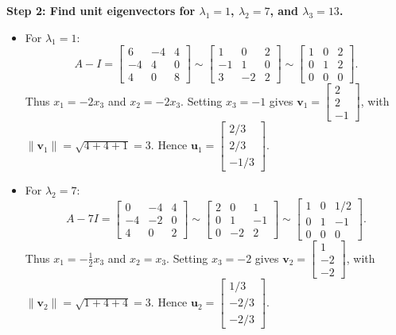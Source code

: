 \documentclass[11pt, letterpaper]{article}
\theoremstyle{definition}
\theoremstyle{remark}
\begin{document}
\textbf{Step 2: Find unit eigenvectors for $\lambda_1 = 1$, $\lambda_2 = 7$, and $\lambda_3 = 13$.}
\begin{itemize}
    \item For $\lambda_1 = 1$:
    \[
    A - I = \begin{bmatrix} 6 & -4 & 4 \\ -4 & 4 & 0 \\ 4 & 0 & 8 \end{bmatrix} \sim \begin{bmatrix} 1 & 0 & 2 \\ -1 & 1 & 0 \\ 3 & -2 & 2 \end{bmatrix} \sim \begin{bmatrix} 1 & 0 & 2 \\ 0 & 1 & 2 \\ 0 & 0 & 0 \end{bmatrix}.
    \]
    Thus $x_1 = -2x_3$ and $x_2 = -2x_3$. Setting $x_3 = -1$ gives $\mathbf{v}_1 = \begin{bmatrix} 2 \\ 2 \\ -1 \end{bmatrix}$, with $\|\mathbf{v}_1\| = \sqrt{4 + 4 + 1} = 3$. Hence $\mathbf{u}_1 = \begin{bmatrix} 2/3 \\ 2/3 \\ -1/3 \end{bmatrix}$.

    \item For $\lambda_2 = 7$:
    \[
    A - 7I = \begin{bmatrix} 0 & -4 & 4 \\ -4 & -2 & 0 \\ 4 & 0 & 2 \end{bmatrix} \sim \begin{bmatrix} 2 & 0 & 1 \\ 0 & 1 & -1 \\ 0 & -2 & 2 \end{bmatrix} \sim \begin{bmatrix} 1 & 0 & 1/2 \\ 0 & 1 & -1 \\ 0 & 0 & 0 \end{bmatrix}.
    \]
    Thus $x_1 = -\frac{1}{2}x_3$ and $x_2 = x_3$. Setting $x_3 = -2$ gives $\mathbf{v}_2 = \begin{bmatrix} 1 \\ -2 \\ -2 \end{bmatrix}$, with $\|\mathbf{v}_2\| = \sqrt{1 + 4 + 4} = 3$. Hence $\mathbf{u}_2 = \begin{bmatrix} 1/3 \\ -2/3 \\ -2/3 \end{bmatrix}$.


\end{itemize}
\end{document}
